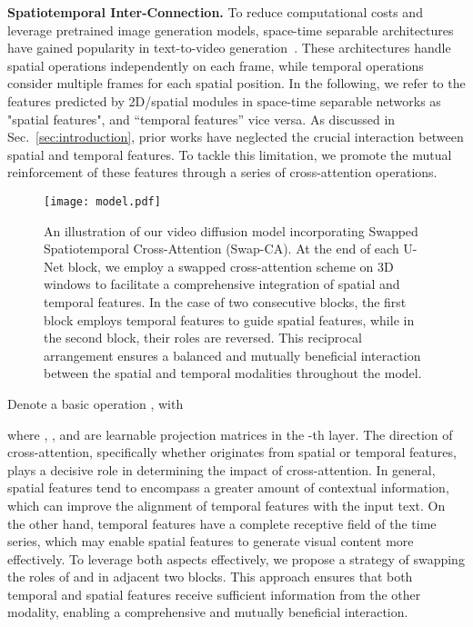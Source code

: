 \documentclass{article}
\begin{document}
\label{sec:method}

\noindent\textbf{Spatiotemporal Inter-Connection.} To reduce computational costs and leverage pretrained image generation models, space-time separable architectures have gained popularity in text-to-video generation~\cite{2022_VDM,2023CogVideo}.
These architectures handle spatial operations independently on each frame, while temporal operations consider multiple frames for each spatial position. 
In the following, we refer to the features predicted by 2D/spatial modules in space-time separable networks as "spatial features", and ``temporal features'' vice versa.
As discussed in Sec.~\ref{sec:introduction}, prior works have neglected the crucial interaction between spatial and temporal features.
To tackle this limitation, we promote the mutual reinforcement of these features through a series of cross-attention operations.










\begin{figure}[t]
    \centering
    \texttt{[image: model.pdf]}
    \caption{An illustration of our video diffusion model incorporating Swapped Spatiotemporal Cross-Attention (Swap-CA). At the end of each U-Net block, we employ a swapped cross-attention scheme on 3D windows to facilitate a comprehensive integration of spatial and temporal features. In the case of two consecutive blocks, the first block employs temporal features to guide spatial features, while in the second block, their roles are reversed. This reciprocal arrangement ensures a balanced and mutually beneficial interaction between the spatial and temporal modalities throughout the model.}
    \label{fig:win_attn}
\end{figure}

Denote a basic operation , with

where , , and  are learnable projection matrices in the -th layer.
The direction of cross-attention, specifically whether  originates from spatial or temporal features, plays a decisive role in determining the impact of cross-attention.
In general, spatial features tend to encompass a greater amount of contextual information, which can improve the alignment of temporal features with the input text. On the other hand, temporal features have a complete receptive field of the time series, which may enable spatial features to generate visual content more effectively.
To leverage both aspects effectively, we propose a strategy of swapping the roles of  and  in adjacent two blocks. This approach ensures that both temporal and spatial features receive sufficient information from the other modality, enabling a comprehensive and mutually beneficial interaction.
\end{document}

